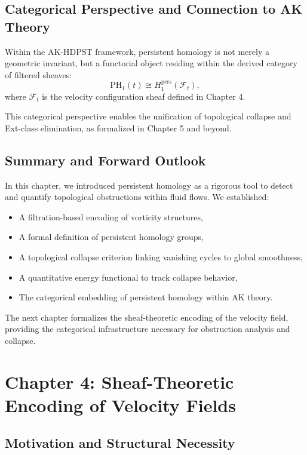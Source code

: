\documentclass[11pt]{article}
\begin{document}
\subsection{Categorical Perspective and Connection to AK Theory}

Within the AK-HDPST framework, persistent homology is not merely a geometric invariant, but a functorial object residing within the derived category of filtered sheaves:
\[
\mathrm{PH}_1(t) \cong H_1^{\mathrm{pers}} \left( \mathcal{F}_t \right),
\]
where \( \mathcal{F}_t \) is the velocity configuration sheaf defined in Chapter 4.

This categorical perspective enables the unification of topological collapse and Ext-class elimination, as formalized in Chapter 5 and beyond.

\subsection{Summary and Forward Outlook}

In this chapter, we introduced persistent homology as a rigorous tool to detect and quantify topological obstructions within fluid flows. We established:

\begin{itemize}
  \item A filtration-based encoding of vorticity structures,
  \item A formal definition of persistent homology groups,
  \item A topological collapse criterion linking vanishing cycles to global smoothness,
  \item A quantitative energy functional to track collapse behavior,
  \item The categorical embedding of persistent homology within AK theory.
\end{itemize}

The next chapter formalizes the sheaf-theoretic encoding of the velocity field, providing the categorical infrastructure necessary for obstruction analysis and collapse.



\section{Chapter 4: Sheaf-Theoretic Encoding of Velocity Fields}

\subsection{Motivation and Structural Necessity}
\end{document}
